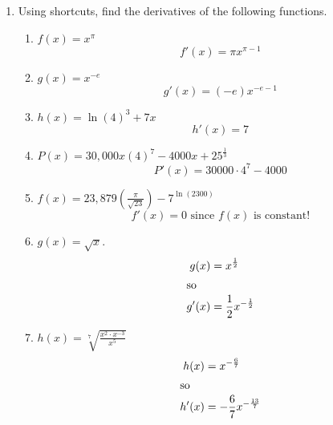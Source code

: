 \documentclass[11pt]{article}
\begin{document}
\begin{enumerate}
\item Using shortcuts, find the derivatives of the following
  functions.
  \begin{enumerate}
  \item $f(x)=x^\pi$
    \vfill
    {\color{blue}
      \[
      f'(x) = \pi x^{\pi-1}
      \]
    }
    \vfill
    \newpage
  \item $g(x)=x^{-e}$
    \vfill
    {\color{blue}
      \[
      g'(x) = (-e)x^{-e-1}
      \]
    }
    \vfill
  \item $h(x)=\ln(4)^3+7x$
    \vfill
    {\color{blue}
      \[
      h'(x) = 7
      \]
    }
    \vfill
  \item $\displaystyle P(x)=30,000x(4)^7-4000x+25^{\frac{1}{3}}$
    \vfill
    {\color{blue}
      \[
      P'(x) = 30000\cdot4^7 - 4000
      \]
    }
    \vfill
    \newpage
  \item $\displaystyle
    f(x)=23,879\left(\frac{\pi}{\sqrt{23}}\right)-7^{\ln(2300)}$
    \vfill
    {\color{blue}
      \[
      f'(x) = 0 \text{ since $f(x)$ is constant!}
      \]
    }
    \vfill
  \item $g(x) = \sqrt{x}$.
    \vfill
    {\color{blue}
      \begin{align*}
        g(x) &= x^{\frac{1}{2}}\\
        \intertext{so}
        g'(x) &= \frac{1}{2}x^{-\frac{1}{2}}
      \end{align*}
    }
    \vfill
  \item $h(x) = \displaystyle\sqrt[7]{\frac{x^2\cdot x^{-3}}{x^5}}$
    \vfill
    {\color{blue}
      \begin{align*}
        h(x) &= x^{-\frac{6}{7}}\\
        \intertext{so}
        h'(x) &= -\frac{6}{7}x^{-\frac{13}{7}}
      \end{align*}
    }
    \vfill
  \end{enumerate}






\end{enumerate}
\end{document}
